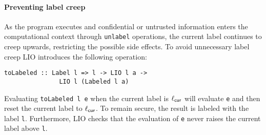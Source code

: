 \paragraph{Preventing label creep}
As the program executes and confidential or untrusted information enters the computational context through \texttt{unlabel} operations, the current label continues to creep upwards, restricting the possible side effects. To avoid unnecessary label creep LIO introduces the following operation:
\begin{verbatim}
toLabeled :: Label l => l -> LIO l a ->
               LIO l (Labeled l a)
\end{verbatim}
Evaluating \texttt{toLabeled l e} when the current label is $\ell_{\mathsf{cur}}$ will evaluate \texttt{e} and then reset the current label to $\ell_{\mathsf{cur}}$. To remain secure, the result is labeled with the label \texttt{l}. Furthermore, LIO checks that the evaluation of \texttt{e} never raises the current label above \texttt{l}.
